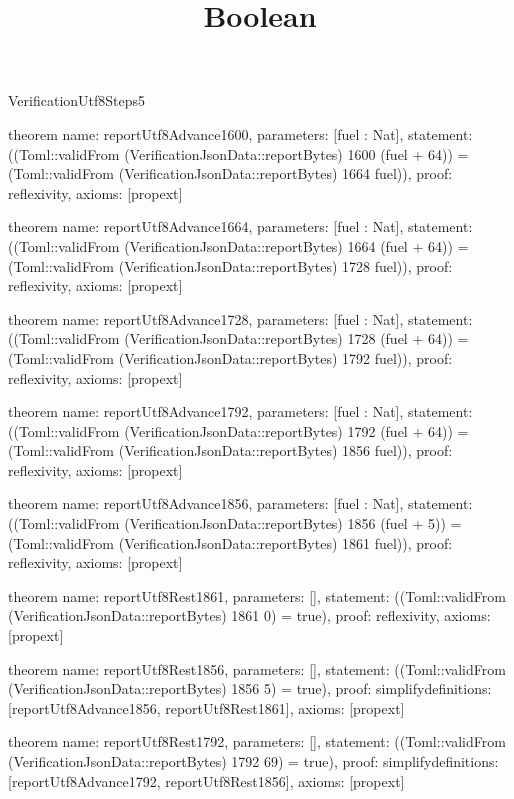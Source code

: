 \begin{lexlean}{VerificationUtf8Steps5}
\title{Boolean}
\begin{semanticmodule}

theorem{
  name: reportUtf8Advance1600,
  parameters: [fuel : Nat],
  statement: ((Toml::validFrom (VerificationJsonData::reportBytes) 1600 (fuel + 64)) = (Toml::validFrom (VerificationJsonData::reportBytes) 1664 fuel)),
  proof: reflexivity{},
  axioms: [propext]
}

theorem{
  name: reportUtf8Advance1664,
  parameters: [fuel : Nat],
  statement: ((Toml::validFrom (VerificationJsonData::reportBytes) 1664 (fuel + 64)) = (Toml::validFrom (VerificationJsonData::reportBytes) 1728 fuel)),
  proof: reflexivity{},
  axioms: [propext]
}

theorem{
  name: reportUtf8Advance1728,
  parameters: [fuel : Nat],
  statement: ((Toml::validFrom (VerificationJsonData::reportBytes) 1728 (fuel + 64)) = (Toml::validFrom (VerificationJsonData::reportBytes) 1792 fuel)),
  proof: reflexivity{},
  axioms: [propext]
}

theorem{
  name: reportUtf8Advance1792,
  parameters: [fuel : Nat],
  statement: ((Toml::validFrom (VerificationJsonData::reportBytes) 1792 (fuel + 64)) = (Toml::validFrom (VerificationJsonData::reportBytes) 1856 fuel)),
  proof: reflexivity{},
  axioms: [propext]
}

theorem{
  name: reportUtf8Advance1856,
  parameters: [fuel : Nat],
  statement: ((Toml::validFrom (VerificationJsonData::reportBytes) 1856 (fuel + 5)) = (Toml::validFrom (VerificationJsonData::reportBytes) 1861 fuel)),
  proof: reflexivity{},
  axioms: [propext]
}

theorem{
  name: reportUtf8Rest1861,
  parameters: [],
  statement: ((Toml::validFrom (VerificationJsonData::reportBytes) 1861 0) = true),
  proof: reflexivity{},
  axioms: [propext]
}

theorem{
  name: reportUtf8Rest1856,
  parameters: [],
  statement: ((Toml::validFrom (VerificationJsonData::reportBytes) 1856 5) = true),
  proof: simplify{definitions: [reportUtf8Advance1856, reportUtf8Rest1861]},
  axioms: [propext]
}

theorem{
  name: reportUtf8Rest1792,
  parameters: [],
  statement: ((Toml::validFrom (VerificationJsonData::reportBytes) 1792 69) = true),
  proof: simplify{definitions: [reportUtf8Advance1792, reportUtf8Rest1856]},
  axioms: [propext]
}

\end{semanticmodule}
\end{lexlean}
